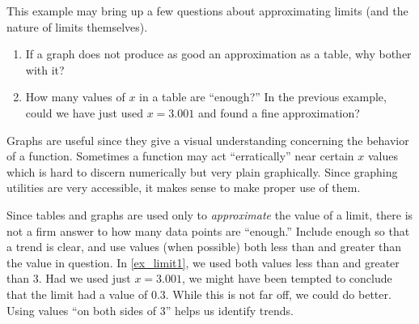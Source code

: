 This example may bring up a few questions about approximating limits (and the nature of limits themselves).
\begin{enumerate}
\item If a graph does not produce as good an approximation as a table, why bother with it?
\item How many values of $x$ in a table are ``enough?'' In the previous example, could we have just used $x=3.001$ and found a fine approximation?
\end{enumerate}

Graphs are useful since they give a visual understanding concerning the behavior of a function. Sometimes a function may act ``erratically'' near certain $x$ values which is hard to discern numerically but very plain graphically. Since graphing utilities are very accessible, it makes sense to make proper use of them.


Since tables and graphs are used only to \emph{approximate} the value of a limit, there is not a firm answer to how many data points are ``enough.'' Include enough so that a trend is clear, and use values (when possible) both less than and greater than the value in question. In \autoref{ex_limit1}, we used both values less than and greater than 3. Had we used just $x=3.001$, we might have been tempted to conclude that the limit had a value of $0.3$. While this is not far off, we could do better. Using values ``on both sides of 3'' helps us identify trends.


